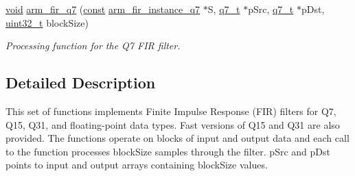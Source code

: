 \begin{DoxyCompactItemize}
\hyperlink{group___n_a_m_e_ga18028b8badbf1ea7e704ccac3c488e82}{void} \hyperlink{group___f_i_r_ga31c91a0bf0962327ef8f626fae68ea32}{arm\-\_\-fir\-\_\-q7} (\hyperlink{group___n_a_m_e_ga7ae6d0e43244213b34de2c2b9aa30da6}{const} \hyperlink{structarm__fir__instance__q7}{arm\-\_\-fir\-\_\-instance\-\_\-q7} $\ast$S, \hyperlink{arm__math_8h_ae541b6f232c305361e9b416fc9eed263}{q7\-\_\-t} $\ast$p\-Src, \hyperlink{arm__math_8h_ae541b6f232c305361e9b416fc9eed263}{q7\-\_\-t} $\ast$p\-Dst, \hyperlink{stdint_8h_a435d1572bf3f880d55459d9805097f62}{uint32\-\_\-t} block\-Size)
\begin{DoxyCompactList}\small\item\em Processing function for the Q7 F\-I\-R filter. \end{DoxyCompactList}\end{DoxyCompactItemize}


\subsection{Detailed Description}
This set of functions implements Finite Impulse Response (F\-I\-R) filters for Q7, Q15, Q31, and floating-\/point data types. Fast versions of Q15 and Q31 are also provided. The functions operate on blocks of input and output data and each call to the function processes {\ttfamily block\-Size} samples through the filter. {\ttfamily p\-Src} and {\ttfamily p\-Dst} points to input and output arrays containing {\ttfamily block\-Size} values.

